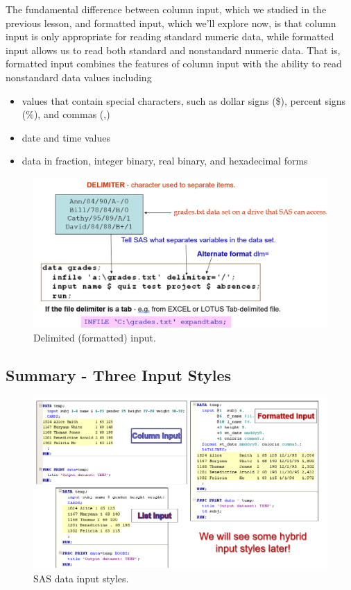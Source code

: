 \documentclass[
]{book}
\providecommand{\tightlist}{%
  \setlength{\itemsep}{0pt}\setlength{\parskip}{0pt}}
\begin{document}
The fundamental difference between column input, which we studied in the previous lesson, and formatted input, which we'll explore now, is that column input is only appropriate for reading standard numeric data, while formatted input allows us to read both standard and nonstandard numeric data. That is, formatted input combines the features of column input with the ability to read nonstandard data values including

\begin{itemize}
\tightlist
\item
  values that contain special characters, such as dollar signs (\$), percent signs (\%), and commas (,)
\item
  date and time values
\item
  data in fraction, integer binary, real binary, and hexadecimal forms
\end{itemize}

\begin{figure}

{\centering \includegraphics[width=0.65\linewidth]{img03/w03-formattedInput} 

}

\caption{Delimited (formatted) input.}\label{fig:unnamed-chunk-17}
\end{figure}

\hypertarget{summary---three-input-styles}{%
\subsection{Summary - Three Input Styles}\label{summary---three-input-styles}}

\begin{figure}

{\centering \includegraphics[width=1\linewidth]{img03/w03-3InputStyles} 

}

\caption{SAS data input styles.}\label{fig:unnamed-chunk-18}
\end{figure}
\end{document}
